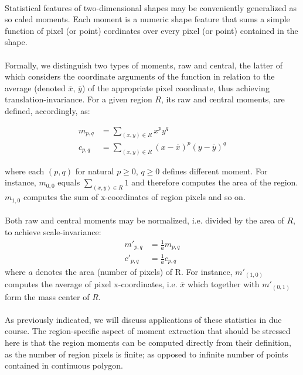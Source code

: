 \paragraph*{}
Statistical features of two-dimensional shapes may be conveniently generalized as so caled moments. Each moment is a numeric shape feature that sums a simple function of pixel (or point) cordinates over every pixel (or point) contained in the shape.

\paragraph*{}
Formally, we distinguish two types of moments, raw and central, the latter of which considers the coordinate arguments of the function in relation to the average (denoted $\overline{x}$, $\overline{y}$) of the appropriate pixel coordinate, thus achieving translation-invariance. For a given region $R$, its raw and central moments, are defined, accordingly, as:

\begin{align*}
	m_{p,q} &= \sum_{(x,y) \in R} x^p y^q \\
	c_{p,q} &= \sum_{(x,y) \in R} (x-\overline{x})^p (y-\overline{y})^q
\end{align*}

where each $(p,q)$ for natural $p \geq 0$, $q \geq 0$ defines different moment. For instance, $m_{0,0}$ equals $\sum_{(x,y) \in R} 1$ and therefore computes the area of the region. $m_{1,0}$ computes the sum of x-coordinates of region pixels and so on.

\paragraph*{}
Both raw and central moments may be normalized, i.e. divided by the area of $R$, to achieve scale-invariance:
\begin{align*}
	m'_{p,q} &= \frac{1}{a} m_{p,q} \\
	c'_{p,q} &= \frac{1}{a} c_{p,q}
\end{align*}
where $a$ denotes the area (number of pixels) of R. For instance, $m'_(1,0)$ computes the average of pixel x-coordinates, i.e. $\overline{x}$ which together with $m'_(0,1)$ form the mass center of $R$.

\paragraph*{}
As previously indicated, we will discuss applications of these statistics in due course. The region-specific aspect of moment extraction that should be stressed here is that the region moments can be computed directly from their definition, as the number of region pixels is finite; as opposed to infinite number of points contained in continuous polygon.

